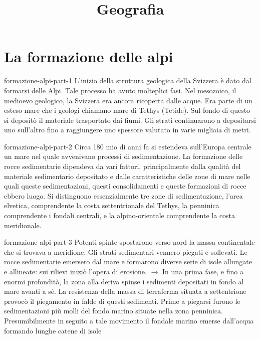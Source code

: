 \documentclass[preview]{standalone}
\begin{document}
\title{Geografia}
\genpage

\section{La formazione delle alpi}

\begin{snippet}{formazione-alpi-part-1}
    L'inizio della struttura geologica della Svizzera è dato dal formarsi delle Alpi. Tale processo ha avuto
    molteplici fasi. Nel mesozoico, il medioevo geologico, la Svizzera era ancora ricoperta dalle acque.
    Era parte di un esteso mare che i geologi chiamano mare di Tethys (Tetide). Sul fondo di questo si
    depositò il materiale trasportato dai fiumi. Gli strati continuarono a depositarsi uno sull'altro fino a
    raggiungere uno spessore valutato in varie migliaia di metri.
\end{snippet}


\begin{snippet}{formazione-alpi-part-2}
    Circa 180 mio di anni fa si estendeva sull’Europa centrale un mare nel quale avvenivano
    processi di sedimentazione.
    La formazione delle rocce sedimentarie dipendeva da vari fattori, principalmente dalla qualità del
    materiale sedimentario depositato e dalle caratteristiche delle zone di mare nelle quali queste
    sedimentazioni, questi consolidamenti e queste formazioni di rocce ebbero luogo. Si distinguono
    essenzialmente tre zone di sedimentazione, l'area elvetica, comprendente la costa settentrionale
    del Tethys, la penninica comprendente i fondali centrali, e la alpino-orientale comprendente la
    costa meridionale.
\end{snippet}


\begin{snippet}{formazione-alpi-part-3}
    Potenti spinte spostarono verso nord la massa continentale che si trovava a meridione. Gli
    strati sedimentari vennero piegati e sollevati. Le rocce sedimentarie emersero dal mare e
    formarono diverse serie di isole allungate e allineate: sui rilievi iniziò l'opera di erosione. \(\rightarrow\) In una
    prima fase, e fino a enormi profondità, la zona alla deriva spinse i sedimenti depositati in fondo al
    mare avanti a sé. La resistenza della massa di terraferma situata a settentrione provocò il
    piegamento in falde di questi sedimenti. Prime a piegarsi furono le sedimentazioni più molli del
    fondo marino situate nella zona penninica. Presumibilmente in seguito a tale movimento il fondale
    marino emerse dall'acqua formando lunghe catene di isole
\end{snippet}
\end{document}
